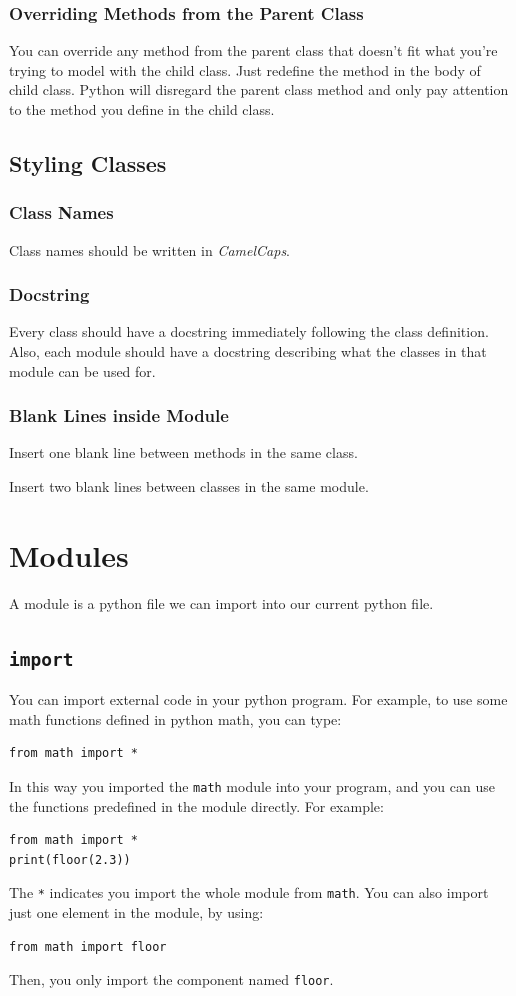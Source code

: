 \documentclass[12pt]{book}
\begin{document}
\subsection{Overriding Methods from the Parent Class}
\label{sec:orga72c0f4}
You can override any method from the parent class that doesn't fit what you're trying to model with the child class. Just redefine the method in the body of child class. Python will disregard the parent class method and only pay attention to the method you define in the child class.
\section{Styling Classes}
\label{sec:org693e1ba}
\subsection{Class Names}
\label{sec:org10aca97}
Class names should be written in \emph{CamelCaps}.
\subsection{Docstring}
\label{sec:org52b6fec}
Every class should have a docstring immediately following the class definition. Also, each module should have a docstring describing what the classes in that module can be used for.
\subsection{Blank Lines inside Module}
\label{sec:orgeb208dd}
Insert one blank line between methods in the same class.

Insert two blank lines between classes in the same module.
\chapter{Modules}
\label{sec:org61db61c}
A module is a python file we can import into our current python file.
\section{\texttt{import}}
\label{sec:org4a8cfce}
You can import external code in your python program. For example, to use some math functions defined in python math, you can type:
\begin{verbatim}
from math import *
\end{verbatim}
In this way you imported the \texttt{math} module into your program, and you can use the functions predefined in the module directly. For example:
\begin{verbatim}
from math import *
print(floor(2.3))
\end{verbatim}
The \texttt{*} indicates you import the whole module from \texttt{math}. You can also import just one element in the module, by using:
\begin{verbatim}
from math import floor
\end{verbatim}
Then, you only import the component named \texttt{floor}.
\end{document}
